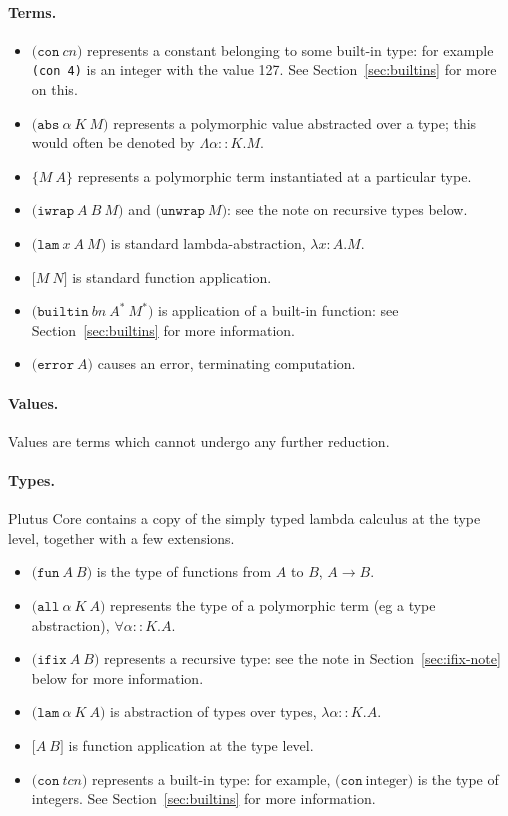 \documentclass[a4paper]{article}
\newcommand{\keyword}[1]{\texttt{#1}}
\newcommand{\construct}[1]{\texttt{(} #1 \texttt{)}}
\newcommand{\con}[1]{\construct{\keyword{con} ~ #1}}
\newcommand{\abs}[3]{\construct{\keyword{abs} ~ #1 ~ #2 ~ #3}}
\newcommand{\inst}[2]{\texttt{\{}#1 ~ #2\texttt{\}}}
\newcommand{\lam}[3]{\construct{\keyword{lam} ~ #1 ~ #2 ~ #3}}
\newcommand{\app}[2]{\texttt{[} #1 ~ #2 \texttt{]}}
\newcommand{\iwrap}[3]{\construct{\keyword{iwrap} ~ #1 ~ #2 ~ #3}}
\newcommand{\unwrap}[1]{\construct{\keyword{unwrap} ~ #1}}
\newcommand{\builtin}[3]{\construct{\keyword{builtin} ~ #1 ~ #2 ~ #3}}
\newcommand{\error}[1]{\construct{\keyword{error} ~ #1}}
\newcommand{\funT}[2]{\construct{\keyword{fun} ~ #1 ~ #2}}
\newcommand{\ifixT}[2]{\construct{\keyword{ifix} ~ #1 ~ #2}}
\newcommand{\fixT}{\ifixT}
\newcommand{\allT}[3]{\construct{\keyword{all} ~ #1 ~ #2 ~ #3}}
\newcommand{\conT}[1]{\construct{\keyword{con} ~ #1}}
\newcommand{\lamT}[3]{\construct{\keyword{lam} ~ #1 ~ #2 ~ #3}}
\newcommand{\appT}[2]{\texttt{[} #1 ~ #2 \texttt{]}}
\begin{document}
\paragraph{Terms.}
\begin{itemize}
\item $\con{cn}$ represents a constant belonging to some built-in
  type: for example \texttt{(con 4)} is an integer with the value 127.
  See Section~\ref{sec:builtins} for more on this.
\item $\abs{\alpha}{K}{M}$ represents a polymorphic value abstracted
  over a type; this would often be denoted by $\Lambda\alpha{::}K.M$.
\item $\inst{M}{A}$ represents a polymorphic term instantiated at a particular type.
\item $\iwrap{A}{B}{M}$ and $\unwrap{M}$: see the note on recursive types below.
\item $\lam{x}{A}{M}$ is standard lambda-abstraction, $\lambda{}x{:}{A}.{M}$.
\item $\app{M}{N}$ is standard function application.
\item $\builtin{bn}{A^*}{M^*}$ is application of a built-in function: see Section~\ref{sec:builtins} for more information.
\item $\error{A}$ causes an error, terminating computation.
\end{itemize}

\paragraph{Values.} Values are terms which cannot undergo any further reduction.

\paragraph{Types.} Plutus Core contains a copy of the simply typed lambda calculus
  at the type level, together with a few extensions.
\begin{itemize}
\item $\funT{A}{B}$ is the type of functions from $A$ to $B$, $A \rightarrow B$.
\item $\allT{\alpha}{K}{A}$ represents the type of a polymorphic term (eg a type abstraction), $\forall \alpha{::}K.A$.
\item $\fixT{A}{B}$ represents a recursive type: see the note in Section~\ref{sec:ifix-note} below for more information.
\item $\lamT{\alpha}{K}{A}$ is abstraction of types over types, $\lambda \alpha{::}K.A$.
\item $\appT{A}{B}$ is function application at the type level.
\item $\conT{tcn}$ represents a built-in type: for example, $\conT{\textrm{integer}}$
is the type of integers.  See Section~\ref{sec:builtins} for more information.
\end{itemize}
\end{document}
